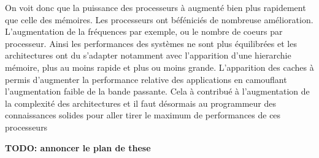 On voit donc que la puissance des processeurs à augmenté bien plus rapidement que celle des mémoires. Les processeurs ont béféniciés de nombreuse amélioration. L'augmentation de la fréquences par exemple, ou le nombre de coeurs par processeur. Ainsi les performances des systèmes ne sont plus équilibrées et les architectures ont du s'adapter notamment avec l'apparition d'une hierarchie mémoire, plus au moins rapide et plus ou moins grande. L'apparition des caches à permis d'augmenter la performance relative des applications en camouflant l'augmentation faible de la bande passante. Cela à contribué à l'augmentation de la complexité des architectures et il faut désormais au programmeur des connaissances solides pour aller tirer le maximum de performances de ces processeurs

\textbf{TODO: annoncer le plan de these}